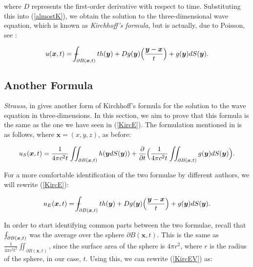 \documentclass[a4paper, 12pt]{article}
\def\Xint#1{\mathchoice
{\XXint\displaystyle\textstyle{#1}}%
{\XXint\textstyle\scriptstyle{#1}}%
{\XXint\scriptstyle\scriptscriptstyle{#1}}%
{\XXint\scriptscriptstyle\scriptscriptstyle{#1}}%
\!\int}
\def\XXint#1#2#3{{\setbox0=\hbox{$#1{#2#3}{\int}$ }
\vcenter{\hbox{$#2#3$ }}\kern-.6\wd0}}
\def\dashint{\Xint-}
\numberwithin{equation}{section}
\begin{document}
where $D$ represents the first-order derivative with respect to time.
Substituting this into (\ref{almostK}), we obtain the solution to the
three-dimensional wave equation, which is known as \emph{Kirchhoff's formula},
but is actually, due to Poisson, see \cite{Str}:

\begin{equation} \label{KircE}
    u(\boldsymbol{x},t)=\dashint_{\partial B(\boldsymbol{x},t)} th(\boldsymbol{y})+Dg(\boldsymbol{y})\Big(\frac{\boldsymbol{y}-\boldsymbol{x}}{t}\Big)+g(\boldsymbol{y})dS(\boldsymbol{y}).
\end{equation}

\subsection{Another Formula}
\emph{Strauss}, in \cite{Str} gives another form of Kirchhoff's formula for the
solution to the wave equation in three-dimensions. In this section, we aim to
prove that this formula is the same as the one we have seen in (\ref{KircE}).
The formulation mentioned in \cite{Str} is as follows, where
$\boldsymbol{x}=(x,y,z)$, as before:

\begin{equation} \label{KircSTR}
    u_S(\boldsymbol{x}, t)=\frac{1}{4 \pi c^2 t}\iint_{\partial B(\boldsymbol{x}, t)} h(\boldsymbol{y}dS(\boldsymbol{y}))+\diffp[1]{}{t}\Big( \frac{1}{4 \pi c^2 t}\iint_{\partial B(\boldsymbol{x}, t)} g(\boldsymbol{y})dS(\boldsymbol{y})\Big).
\end{equation}

For a more comfortable identification of the two formulae by different authors,
we will rewrite (\ref{KircE}): 

\begin{equation} \label{KircEV}
    u_E(\boldsymbol{x},t)=\dashint_{\partial B(\boldsymbol{x},t)} th(\boldsymbol{y})+Dg(\boldsymbol{y})\Big(\frac{\boldsymbol{y}-\boldsymbol{x}}{t}\Big)+g(\boldsymbol{y})dS(\boldsymbol{y}).
\end{equation}

In order to start identifying common parts between the two formulae, recall that
$\dashint_{\partial B(\boldsymbol{x}, t)}$ was the average over the sphere
$\partial B(\boldsymbol{x}, t)$. This is the same as $\frac{1}{4 \pi c^2
t^2}\iint_{\partial B(\boldsymbol{x}, t)}$, since the surface area of the sphere
is $4\pi r^2$, where $r$ is the radius of the sphere, in our case, $t$. Using
this, we can rewrite (\ref{KircEV}) as:
\end{document}
